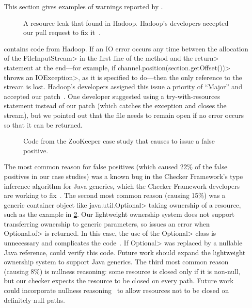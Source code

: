This section gives examples of warnings reported by \tool.

\begin{figure}
  
  \prefigcaption
  \caption{A resource leak that \tool found in Hadoop. Hadoop's developers
    accepted our pull request
    to fix it~\cite{hdfs-15791}.}
  \label{fig:hadoop-bug}
\end{figure}

 contains code from Hadoop. If an IO error
occurs any time between the allocation of the \<FileInputStream>
in the first line of the method and the \<return> statement
at the end---for example, if \<channel.position(section.getOffset())>
throws an \<IOException>, as it is specified to do---then the
only reference to the stream is lost. Hadoop's developers
assigned this issue a priority of ``Major'' and accepted our
patch~\cite{hdfs-15791}.
One developer suggested using a try-with-resources statement instead
of our patch (which catches the exception and closes the stream),
but we pointed out that
the file needs to remain open if no error occurs so that it can be
returned.

\begin{figure}
  
  \prefigcaption
  \caption{Code from the ZooKeeper case study that causes \tool
  to issue a false positive.}
  \label{fig:zookeeper-optional}
\end{figure}

The most common reason for false
positives (which caused 22\% of the false positives in our case studies) was
a known bug in the Checker Framework's
type inference algorithm for Java generics, which the Checker Framework
developers are working to fix~\cite{issue979}.
The second most common reason (causing 15\%)
was a generic container object like \<java.util.Optional> taking ownership of a resource, such
as the example in \cref{fig:zookeeper-optional}. Our lightweight ownership
system does not support transferring ownership to generic parameters,
so \tool issues an error when \<Optional.of> is returned. In this case, the use
of the \<Optional> class is unnecessary and complicates the
code~\cite{ErnstNothingIsBetterThanOptional}.  If \<Optional> was replaced
by a nullable Java reference,
\tool could verify this code. Future work should expand the lightweight ownership system to
support Java generics.
The third most common reason (causing 8\%) is nullness reasoning: some resource
is closed only if it is non-null, but our checker expects the resource to be
closed on every path. Future work could incorporate nullness reasoning~\cite{PapiACPE2008} to
allow resources not to be closed on definitely-null paths.

